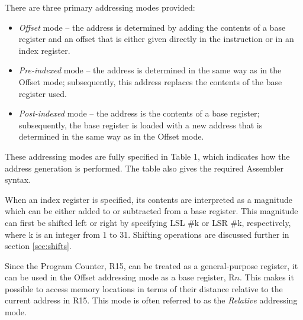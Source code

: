 \documentclass[11pt, twoside, pdftex]{article}
\begin{document}
There are three primary addressing modes provided:
\begin{itemize}
\item {\it Offset} mode -- the address is determined by adding
the contents of a base register and an offset that is either
given directly in the instruction or in an index register.
\item {\it Pre-indexed} mode -- the address is determined
in the same way as in the Offset mode; subsequently, this
address replaces the contents of the base register used. 
\item {\it Post-indexed} mode -- the address is the contents
of a base register; subsequently, the base register is loaded
with a new address that is determined in the same way as in
the Offset mode.
\end{itemize}

\noindent
These addressing modes are fully specified in Table 1, 
which indicates how the address generation is performed.
The table also gives the required Assembler syntax.

When an index register is specified, its contents are interpreted
as a magnitude which can be either added to or subtracted from 
a base register. This magnitude can first be shifted left or
right by specifying LSL \#k or LSR \#k, respectively, where k
is an integer from 1 to 31. Shifting operations are discussed further in 
section \ref{sec:shifts}.

Since the Program Counter, R15, can be treated as a
general-purpose register, it can be used in the Offset
addressing mode as a base register, R$n$. This makes it possible
to access memory locations in terms of their 
distance relative to the current address in R15.
This mode is often referred to as the {\it Relative} addressing
mode. 
\end{document}
